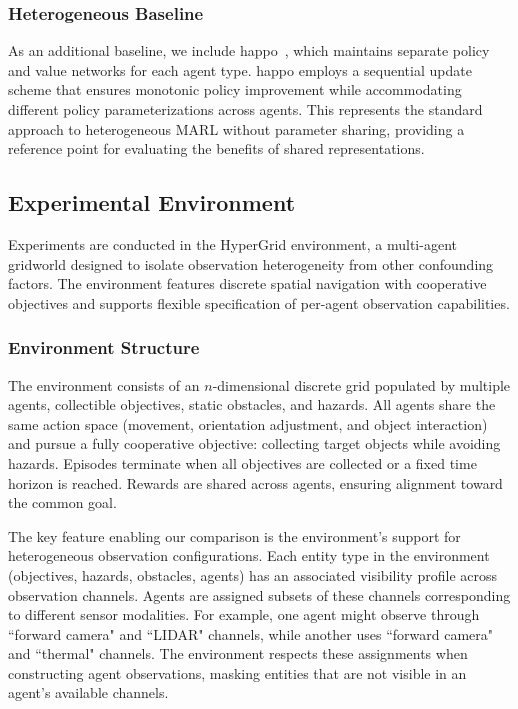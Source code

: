 \documentclass[conference]{IEEEtran}
\begin{document}
\subsubsection{Heterogeneous Baseline}

As an additional baseline, we include \gls{happo}~\cite{zhong2024}, 
which maintains separate policy and value networks for each agent type. 
\Gls{happo} employs a sequential update scheme that ensures monotonic policy improvement 
while accommodating different policy parameterizations across agents. 
This represents the standard approach to heterogeneous MARL without parameter sharing, 
providing a reference point for evaluating the benefits of shared representations.

\subsection{Experimental Environment}

Experiments are conducted in the HyperGrid environment, 
a multi-agent gridworld designed to isolate observation 
heterogeneity from other confounding factors.%
The environment features discrete spatial navigation with cooperative 
objectives and supports flexible specification of per-agent observation capabilities.

\subsubsection{Environment Structure}

The environment consists of an \(n\)-dimensional discrete grid populated 
by multiple agents, collectible objectives, static obstacles, and hazards. 
All agents share the same action space (movement, orientation adjustment, 
and object interaction) and pursue a fully cooperative objective: 
collecting target objects while avoiding hazards. 
Episodes terminate when all objectives are collected or a fixed time horizon is reached. 
Rewards are shared across agents, ensuring alignment toward the common goal.

The key feature enabling our comparison is the environment's 
support for heterogeneous observation configurations. 
Each entity type in the environment (objectives, hazards, obstacles, agents) 
has an associated visibility profile across observation channels. 
Agents are assigned subsets of these channels corresponding to 
different sensor modalities. For example, one agent might 
observe through ``forward camera" and ``LIDAR" channels, 
while another uses ``forward camera" and ``thermal" channels. 
The environment respects these assignments when constructing agent observations, 
masking entities that are not visible in an agent's available channels.
\end{document}
